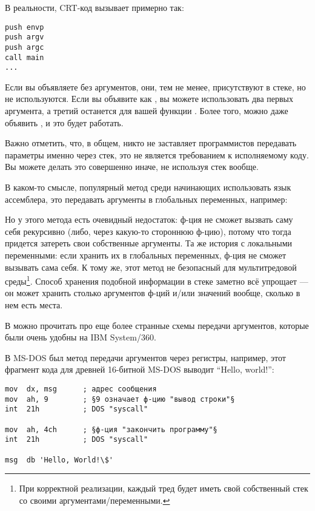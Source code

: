 В реальности, \ac{CRT}-код вызывает \main примерно так:
	
\begin{lstlisting}
push envp
push argv
push argc
call main
...
\end{lstlisting}

Если вы объявляете \main без аргументов, они, тем не менее, присутствуют в стеке, но не используются.
Если вы объявите \main как , 
вы можете использовать два первых аргумента, а третий останется для вашей функции .
Более того, можно даже объявить , и это будет работать.


Важно отметить, что, в общем, никто не заставляет программистов передавать параметры именно через стек, это не является требованием к исполняемому коду.
Вы можете делать это совершенно иначе, не используя стек вообще.

В каком-то смысле, популярный метод среди начинающих использовать язык ассемблера,
это передавать аргументы в глобальных переменных, например:



Но у этого метода есть очевидный недостаток: ф-ция  не сможет вызвать саму себя рекурсивно (либо, через
какую-то стороннюю ф-цию),
потому что тогда придется затереть свои собственные аргументы.
Та же история с локальными переменными: если хранить их в глобальных переменных, ф-ция не сможет вызывать сама себя.
К тому же, этот метод не безопасный для мультитредовой среды\footnote{При корректной реализации,
каждый тред будет иметь свой собственный стек со своими аргументами/переменными.}.
Способ хранения подобной информации в стеке заметно всё упрощает ---
он может хранить столько аргументов ф-ций и/или значений вообще,
сколько в нем есть места.

В  можно прочитать про еще более странные схемы передачи аргументов,
которые были очень удобны на IBM System/360.


В MS-DOS был метод передачи аргументов через регистры, например, этот фрагмент кода для древней 16-битной MS-DOS
выводит ``Hello, world!'':

\begin{lstlisting}
mov  dx, msg      ; адрес сообщения
mov  ah, 9        ; §9 означает ф-цию "вывод строки"§
int  21h          ; DOS "syscall"

mov  ah, 4ch      ; §ф-ция "закончить программу"§
int  21h          ; DOS "syscall"

msg  db 'Hello, World!\$'
\end{lstlisting}

